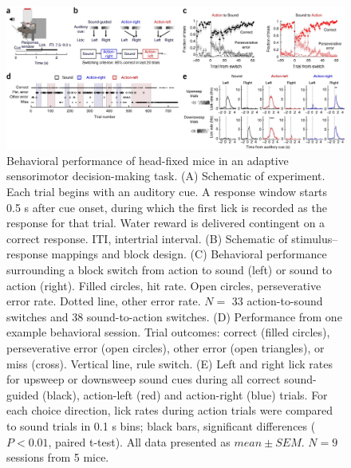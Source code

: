\begin{figure}[htbp]

\begin{center}
\includegraphics[width=\textwidth]{Figures/NN_fig1.jpg} 
\end{center}

\caption[Behavioral performance of head-fixed mice in an adaptive sensorimotor decision-making task]
{Behavioral performance of head-fixed mice in an adaptive sensorimotor decision-making task.
(A) Schematic of experiment. Each trial begins with an auditory cue. A response window starts 0.5 s after cue onset, during which the first lick is recorded as the response for that trial. Water reward is delivered contingent on a correct response. ITI, intertrial interval. (B) Schematic of stimulus–response mappings and block design. (C) Behavioral performance surrounding a block switch from action to sound (left) or sound to action (right). Filled circles, hit rate. Open circles, perseverative error rate. Dotted line, other error rate. $N=$ 33 action-to-sound switches and 38 sound-to-action switches. (D) Performance from one example behavioral session. Trial outcomes: correct (filled circles), perseverative error (open circles), other error (open triangles), or miss (cross). Vertical line, rule switch. (E) Left and right lick rates for upsweep or downsweep sound cues during all correct sound-guided (black), action-left (red) and action-right (blue) trials. For each choice direction, lick rates during action trials were compared to sound trials in 0.1 s bins; black bars, significant differences ($P < 0.01$, paired t-test). All data presented as $mean \pm SEM$. $N = 9$ sessions from 5 mice.}

\label{fig:NN_fig1}
\end{figure}